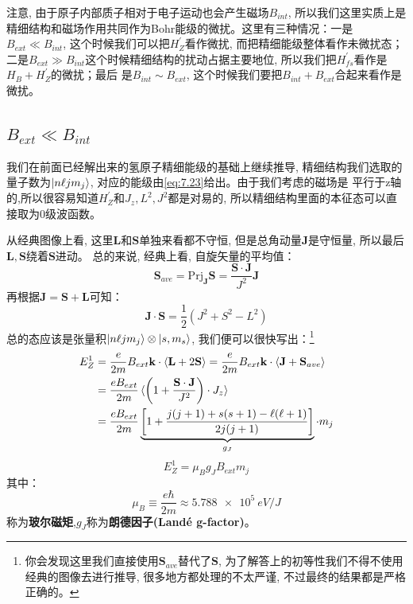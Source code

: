 \documentclass[a4paper,zihao=-4,linespread=1]{ctexrep}
\begin{document}
    注意, 由于原子内部质子相对于电子运动也会产生磁场$B_{int}$, 所以我们这里实质上是精细结构和磁场作用共同作为Bohr能级的微扰。这里有三种情况：一是$B_{ext}\ll B_{int}$, 
    这个时候我们可以把$H_Z^\prime$看作微扰, 而把精细能级整体看作未微扰态；二是$B_{ext}\gg B_{int}$这个时候精细结构的扰动占据主要地位, 所以我们把$H_{fs}^\prime$看作是$H_B+H_Z^\prime$的微扰；最后
    是$B_{int}\sim B_{ext}$, 这个时候我们要把$B_{int}+ B_{ext}$合起来看作是微扰。
    \subsection*{$B_{ext}\ll B_{int}$}
    我们在前面已经解出来的氢原子精细能级的基础上继续推导, 精细结构我们选取的量子数为$\ket{n\ell jm_j}$, 对应的能级由\ref{eq:7.23}给出。由于我们考虑的磁场是
    平行于z轴的,所以很容易知道$H_Z^\prime$和$J_z,L^2,J^2$都是对易的, 所以精细结构里面的本征态可以直接取为0级波函数。

    从经典图像上看, 这里$\mathbf{L}$和$\mathbf{S}$单独来看都不守恒, 但是总角动量$\mathbf{J}$是守恒量, 所以最后$\mathbf{L},\mathbf{S}$绕着$\mathbf{S}$进动。
    总的来说, 经典上看, 自旋矢量的平均值：
    \begin{equation}
        \mathbf{S}_{ave}=\mathrm{Prj}_{\mathbf{J}}\mathbf{S}=\frac{\mathbf{S}\cdot\mathbf{J}}{J^2}\mathbf{J}
    \end{equation}
    再根据$\mathbf{J}=\mathbf{S}+\mathbf{L}$可知：
    \[\mathbf{J}\cdot\mathbf{S}=\frac{1}{2}\left(J^2+S^2-L^2\right)\]
    总的态应该是张量积$\ket{n\ell jm_j}\otimes\ket{s,m_s}$, 我们便可以很快写出：\footnote{你会发现这里我们直接使用$\mathbf{S}_{ave}$替代了$\mathbf{S}$, 为了解答上的初等性我们不得不使用经典的图像去进行推导, 很多地方都处理的不太严谨, 不过最终的结果都是严格正确的。}
    \begin{align*}
        E_Z^1&=\frac{e}{2m}B_{ext}\mathbf{k}\cdot\braket{\mathbf{L}+2\mathbf{S}}=\frac{e}{2m}B_{ext}\mathbf{k}\cdot\braket{\mathbf{J}+\mathbf{S}_{ave}}\\
        &=\frac{eB_{ext}}{2m}\braket{\left(1+\frac{\mathbf{S}\cdot\mathbf{J}}{J^2}\right)\cdot J_z}\\
        &=\frac{eB_{ext}}{2m}\underbrace{\left[1+\frac{j(j+1)+s(s+1)-\ell(\ell+1)}{2j(j+1)}\right]}_{g_J}\cdot m_j
    \end{align*}
    \begin{equation}
        \label{eq:7.25}
        \boxed{E_Z^1=\mu_B g_J B_{ext}m_j}
    \end{equation}
    其中：
    \begin{equation}
        \mu_B\equiv\frac{e\hbar}{2m}\approx\SI{5.788e5}{eV/J}
    \end{equation}
    称为\textbf{玻尔磁矩},$g_J$称为\textbf{朗德因子(Landé g-factor)}。
\end{document}

